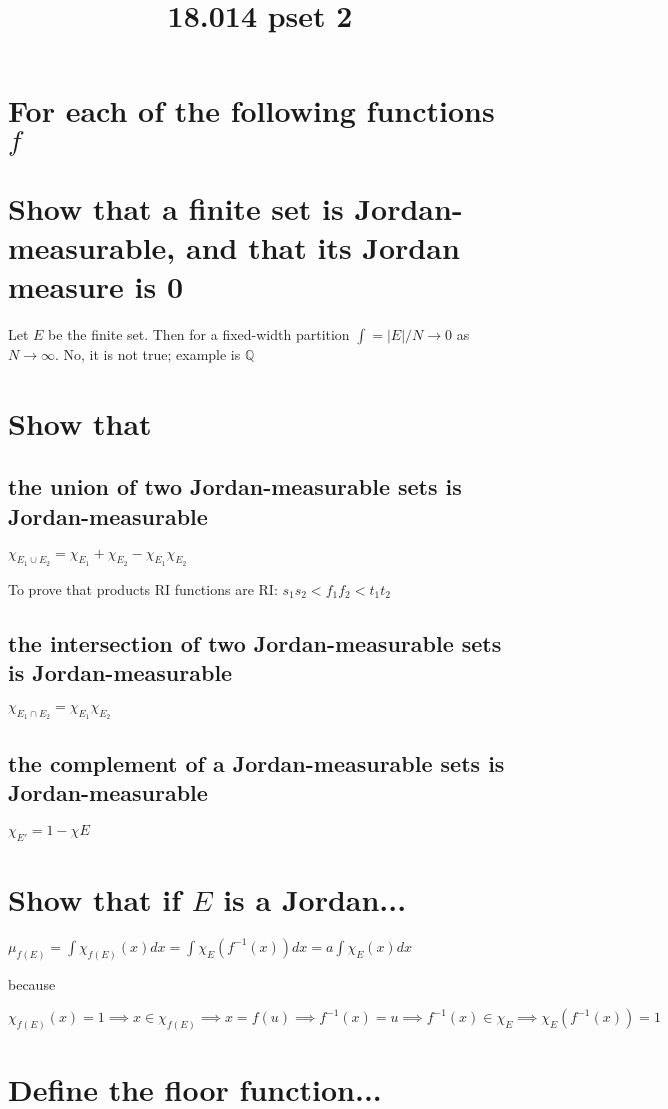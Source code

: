 \documentclass{article}
\title{18.014 pset 2}
\date{}
\begin{document}
\maketitle

\setcounter{section}{17}
\section{For each of the following functions $f$}

\section{Show that a finite set is Jordan-measurable, and that its Jordan measure is 0}

Let $E$ be the finite set. Then for a fixed-width partition $\int = |E|/N \rightarrow 0$ as $N \rightarrow \infty$. No, it is not true; example is $\mathbb{Q}$

\section{Show that}
\subsection*{the union of two Jordan-measurable sets is Jordan-measurable}

$\chi_{E_1 \cup E_2} = \chi_{E_1} + \chi_{E_2} - \chi_{E_1}\chi_{E_2}$

To prove that products RI functions are RI: $s_1s_2 < f_1f_2 < t_1t_2$

\subsection*{the intersection of two Jordan-measurable sets is Jordan-measurable}

$\chi_{E_1 \cap E_2} = \chi_{E_1}\chi_{E_2}$

\subsection*{the complement of a Jordan-measurable sets is Jordan-measurable}

$\chi_{E'} = 1 - \chi{E}$

\section{Show that if $E$ is a Jordan...}

$\mu_{f(E)} = \int \chi_{f(E)} (x) dx = \int\chi_E(f^{-1}(x)) dx = a\int\chi_E(x)dx$

because

$\chi_{f(E)} (x) = 1 \implies x \in \chi_{f(E)} \implies x = f(u) \implies f^{-1}(x) = u \implies f^{-1}(x) \in \chi_{E} \implies \chi_E(f^{-1}(x)) = 1$

\section{Define the floor function...}
\end{document}

